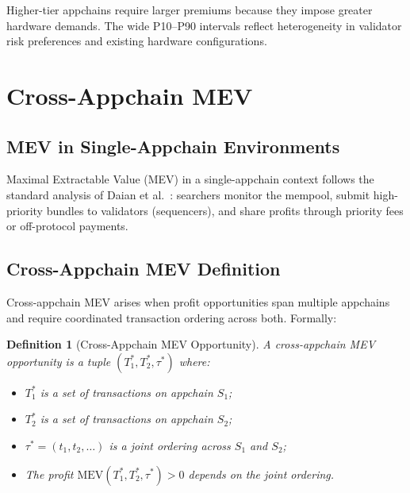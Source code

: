 \documentclass[11pt]{article}
\newtheorem{definition}{Definition}
\begin{document}
Higher-tier appchains require larger premiums because they impose greater hardware demands.
The wide P10--P90 intervals reflect heterogeneity in validator risk preferences and
existing hardware configurations.

\section{Cross-Appchain MEV}
\label{sec:mev}

\subsection{MEV in Single-Appchain Environments}

Maximal Extractable Value (MEV) in a single-appchain context follows the standard analysis
of Daian et al.~\cite{daian2020flash}: searchers monitor the mempool, submit high-priority
bundles to validators (sequencers), and share profits through priority fees or off-protocol
payments.

\subsection{Cross-Appchain MEV Definition}

Cross-appchain MEV arises when profit opportunities span multiple appchains and require
coordinated transaction ordering across both. Formally:

\begin{definition}[Cross-Appchain MEV Opportunity]
A \emph{cross-appchain MEV opportunity} is a tuple $(T_1^*, T_2^*, \tau^*)$ where:
\begin{itemize}
  \item $T_1^*$ is a set of transactions on appchain $S_1$;
  \item $T_2^*$ is a set of transactions on appchain $S_2$;
  \item $\tau^* = (t_1, t_2, \ldots)$ is a joint ordering across $S_1$ and $S_2$;
  \item The profit $\text{MEV}(T_1^*, T_2^*, \tau^*) > 0$ depends on the joint ordering.
\end{itemize}
\end{definition}
\end{document}
